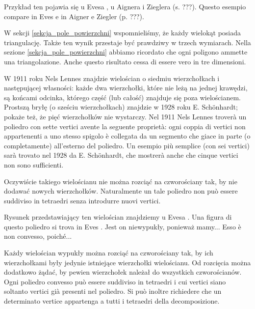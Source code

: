 Przykład ten pojawia się u Evesa \cite[s. 216]{eves1_1972}, u Aignera i Zieglera (s. ???). %
Questo esempio compare in Eves \cite[p. 216]{eves1_1972} e in Aigner e Ziegler (p. ???). %

W sekcji \ref{sekcja_pole_powierzchni} wspomnieliśmy, że każdy wielokąt posiada triangulację. %
Także ten wynik przestaje być prawdziwy w trzech wymiarach. %
Nella sezione \ref{sekcja_pole_powierzchni} abbiamo ricordato che ogni poligono ammette una triangolazione. %
Anche questo risultato cessa di essere vero in tre dimensioni. %

W 1911 roku Nels Lennes znajdzie wielościan o siedmiu wierzchołkach i następującej własności: każde dwa wierzchołki, które nie leżą na jednej krawędzi, są końcami odcinka, którego część (lub całość) znajduje się poza wielościanem. %
Prostszą bryłę (o sześciu wierzchołkach) znajdzie w 1928 roku E. Schönhardt; pokaże też, że pięć wierzchołków nie wystarczy. %
Nel 1911 Nels Lennes troverà un poliedro con sette vertici avente la seguente proprietà: ogni coppia di vertici non appartenenti a uno stesso spigolo è collegata da un segmento che giace in parte (o completamente) all'esterno del poliedro. %
Un esempio più semplice (con sei vertici) sarà trovato nel 1928 da E. Schönhardt, che mostrerà anche che cinque vertici non sono sufficienti. %

Oczywiście takiego wielościanu nie można rozciąć na czworościany tak, by nie dodawać nowych wierzchołków. %
Naturalmente un tale poliedro non può essere suddiviso in tetraedri senza introdurre nuovi vertici. %

Rysunek przedstawiający ten wielościan znajdziemy u Evesa \cite[s. 211]{eves1_1972}. %
Una figura di questo poliedro si trova in Eves \cite[p. 211]{eves1_1972}. %
Jest on niewypukły, ponieważ mamy... %
Esso è non convesso, poiché... %

\begin{proposition}
[twierdzenie Cauchy'ego] %
[teorema di Cauchy] %
    Każdy wielościan wypukły można rozciąć na czworościany tak, by ich wierzchołkami były jedynie istniejące wierzchołki wielościanu. %
    Od rozcięcia można dodatkowo żądać, by pewien wierzchołek należał do wszystkich czworościanów. %
    Ogni poliedro convesso può essere suddiviso in tetraedri i cui vertici siano soltanto vertici già presenti nel poliedro. %
    Si può inoltre richiedere che un determinato vertice appartenga a tutti i tetraedri della decomposizione. %
\end{proposition}

%